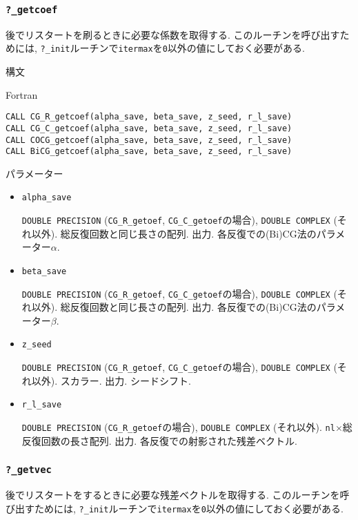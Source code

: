 \documentclass[12pt,titlepage]{jarticle}
\begin{document}
\subsubsection{\texttt{?\_getcoef}}

後でリスタートを刷るときに必要な係数を取得する.
このルーチンを呼び出すためには,
\verb|?_init|ルーチンで\verb|itermax|を\verb|0|以外の値にしておく必要がある.

\noindent 構文

\noindent Fortran
\begin{verbatim}
CALL CG_R_getcoef(alpha_save, beta_save, z_seed, r_l_save)
CALL CG_C_getcoef(alpha_save, beta_save, z_seed, r_l_save)
CALL COCG_getcoef(alpha_save, beta_save, z_seed, r_l_save)
CALL BiCG_getcoef(alpha_save, beta_save, z_seed, r_l_save)
\end{verbatim}

\noindent パラメーター

\begin{itemize}
\item \verb|alpha_save|

  \verb|DOUBLE PRECISION| (\verb|CG_R_getoef|, \verb|CG_C_getoef|の場合),
  \verb|DOUBLE COMPLEX| (それ以外).
  総反復回数と同じ長さの配列. 出力. 各反復での(Bi)CG法のパラメーター$\alpha$.

\item \verb|beta_save|

  \verb|DOUBLE PRECISION| (\verb|CG_R_getoef|, \verb|CG_C_getoef|の場合),
  \verb|DOUBLE COMPLEX| (それ以外).
  総反復回数と同じ長さの配列. 出力. 各反復での(Bi)CG法のパラメーター$\beta$.

\item \verb|z_seed|

  \verb|DOUBLE PRECISION| (\verb|CG_R_getoef|, \verb|CG_C_getoef|の場合),
  \verb|DOUBLE COMPLEX| (それ以外).
  スカラー. 出力. シードシフト.

\item \verb|r_l_save|
  
  \verb|DOUBLE PRECISION| (\verb|CG_R_getoef|の場合),
  \verb|DOUBLE COMPLEX| (それ以外).
  \verb|nl|$\times$総反復回数の長さ配列. 出力.
  各反復での射影された残差ベクトル.
\end{itemize}

\subsubsection{\texttt{?\_getvec}}

後でリスタートをするときに必要な残差ベクトルを取得する.
このルーチンを呼び出すためには,
\verb|?_init|ルーチンで\verb|itermax|を\verb|0|以外の値にしておく必要がある.
\end{document}
